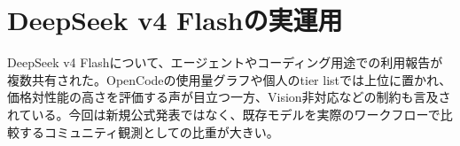 \section{DeepSeek v4 Flashの実運用}
DeepSeek v4 Flashについて、エージェントやコーディング用途での利用報告が複数共有された。OpenCodeの使用量グラフや個人のtier listでは上位に置かれ、価格対性能の高さを評価する声が目立つ一方、Vision非対応などの制約も言及されている。今回は新規公式発表ではなく、既存モデルを実際のワークフローで比較するコミュニティ観測としての比重が大きい。

